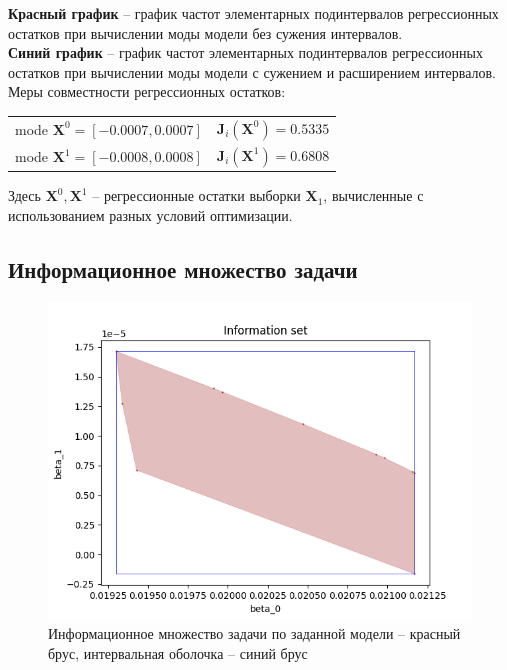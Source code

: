 \textbf{Красный график} -- график частот элементарных подинтервалов регрессионных остатков при вычислении моды модели без сужения интервалов. \\
\textbf{Синий график} -- график частот элементарных подинтервалов регрессионных остатков при вычислении моды модели с сужением и расширением интервалов. \\

Меры совместности регрессионных остатков: \\

\begin{tabular}{c c}
	mode $\bm{X}^0 = [-0.0007, 0.0007]$ & $\bm{J}_i(\bm{X}^0) = 0.5335$ \\
	mode $\bm{X}^1 = [-0.0008, 0.0008]$ & $\bm{J}_i(\bm{X}^1) = 0.6808$ \\
\end{tabular}

Здесь $\bm{X}^{0}, \bm{X}^{1}$ -- регрессионные остатки выборки $\bm{X}_1$, вычисленные с использованием разных условий оптимизации. \\

\subsection{Информационное множество задачи} 

\begin{figure}[H]
	\begin{center}
		\includegraphics[scale = 0.55]{resources/inform_set.png}
	\end{center}
	\caption{Информационное множество задачи по заданной модели -- красный брус, интервальная оболочка -- синий брус}
\end{figure}

